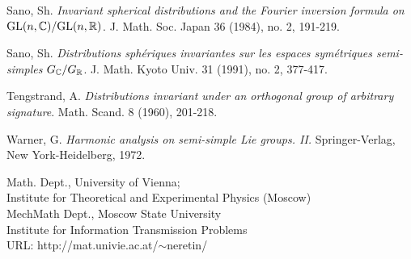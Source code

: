\documentclass{article}
\begin{document}
\begin{thebibliography}{cc}
 Sano, Sh. {\it Invariant spherical distributions and the Fourier inversion formula on $\mathrm {GL}(n,{\mathbb C })/\mathrm {GL}(n,{\mathbb R })$}.
  J. Math. Soc. Japan 36 (1984), no. 2, 191-219.

 Sano, Sh. {\it Distributions sph\'eriques invariantes sur les espaces sym\'etriques semi-simples $G_{\mathbb C }/G_{\mathbb R }$}.
  J. Math. Kyoto Univ. 31 (1991), no. 2, 377-417.

  Tengstrand, A. {\it Distributions invariant under an orthogonal group of arbitrary signature}.
   Math. Scand. 8 (1960), 201-218.
 
 Warner, G. {\it Harmonic analysis on semi-simple Lie groups. II.}
  Springer-Verlag, New York-Heidelberg, 1972.


\end{thebibliography}

\tt

\noindent
Math. Dept., University of Vienna; \\
Institute for Theoretical and Experimental Physics (Moscow) \\
MechMath Dept., Moscow State University\\
Institute for Information Transmission Problems\\
URL: http://mat.univie.ac.at/$\sim$neretin/
\end{document}

